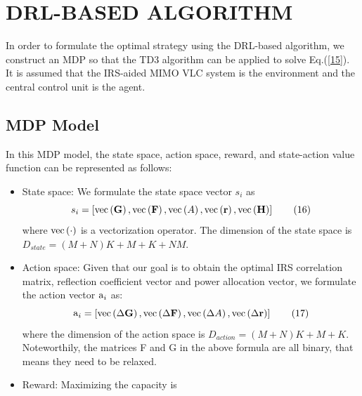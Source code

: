 \documentclass[conference]{IEEEtran}
\begin{document}
     \section{DRL-BASED ALGORITHM}
  In order to formulate the optimal strategy using the DRL-based algorithm, 
  we construct an MDP so that the TD3 algorithm can be applied to solve  
  Eq.(\ref{15}). It is assumed that the IRS-aided MIMO VLC system is the 
  environment and the central control unit is the agent.
   \subsection{MDP Model}
   In this MDP model, the state space, action space, reward, and state-action 
   value function can be represented as follows:
    \begin{itemize}
     \item State space: We formulate the state space vector ${s_i}$ as
         \begin{equation}
         {s_i} = \left[ {{\mathop{\rm vec}\nolimits} \left( {\bf{G}} \right),{\mathop{\rm vec}\nolimits} \left( {\bf{F}} \right),{\mathop{\rm vec}\nolimits} \left( A \right),{\mathop{\rm vec}\nolimits} \left( {\bf{r}} \right),{\mathop{\rm vec}\nolimits} \left( {\bf{H}} \right)} \right]
         \tag{16}\label{eq16}
         \end{equation}
       where ${\mathop{\rm vec}\nolimits} \left(  \cdot  \right)$ is a vectorization operator. The dimension of the state 
       space is ${D_{state}} = (M + N)K + M + K + NM$.
     \item Action space:  Given that our goal is to obtain the optimal IRS 
     correlation matrix, reflection coefficient vector and power allocation
      vector, we formulate the action vector ${{\mathop{\rm a}\nolimits} _i}$ as:
           \begin{equation}
           {{\mathop{\rm a}\nolimits} _i} = \left[ {{\mathop{\rm vec}\nolimits} \left( {\Delta {\bf{G}}} \right),{\mathop{\rm vec}\nolimits} \left( {\Delta {\bf{F}}} \right),{\mathop{\rm vec}\nolimits} \left( {\Delta A} \right),{\mathop{\rm vec}\nolimits} \left( {\Delta {\bf{r}}} \right)} \right]
           \tag{17}\label{eq17}
           \end{equation}
       where the dimension of the action space is ${D_{action}} = (M + N)K + M + K$.
       Noteworthily, the matrices F and G in the above formula are all binary, 
       that means they need to be relaxed.
     \item Reward: Maximizing the capacity is 

\end{itemize}
\end{document}
